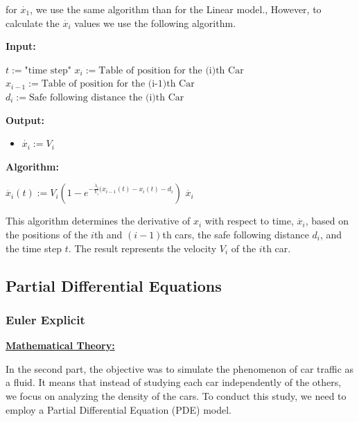 \documentclass{article}
\begin{document}
		for $\dot{x_1}$, we use the same algorithm than for the Linear model., However, to calculate the $\dot{x_i}$ values we use the following algorithm.
		
		\begin{algorithm}[H]
			\caption{$\dot{x_i}$}\label{alg:xi_dot}
			\begin{algorithmic}
				\State \textbf{Input:} \\
				\begin{itemize}
					\State $t:=\text{"time  step"}$
					\State$x_i:=\text{Table of position for the (i)th Car}$
					\State$x_{i-1}:=\text{Table of position for the (i-1)th Car}$
					\State$d_{i}:=\text{Safe following distance the (i)th Car}$
				\end{itemize}
				\State \textbf{Output:} \\
				\begin{itemize}[]
					\item $\dot{x_i}:=V_i$
				\end{itemize}
				\State \textbf{Algorithm:} \\
				\begin{itemize}[]
					\State $\dot{x_i}(t):=V_i(1-e^{-\frac{\lambda_i}{V_i}(x_{i-1}(t) - x_i(t) - d_i})$ 
					\State \Return $\dot{x_i}$ 
				\end{itemize}		
			\end{algorithmic}
		\end{algorithm}
		This algorithm determines the derivative of $x_i$ with respect to time, $\dot{x_i}$, based on the positions of the $i$th and $(i-1)$th cars, the safe following distance $d_i$, and the time step $t$. The result represents the velocity $V_i$ of the $i$th car.
		\subsection{Partial Differential Equations}
		
		\subsubsection{Euler Explicit}
		
		\textbf{\underline{Mathematical Theory:}} \newline\newline
		
		In the second part, the objective was to simulate the phenomenon of car traffic as a fluid. It means that instead of studying each car independently of the others, we focus on analyzing the density of the cars. To conduct this study, we need to employ a Partial Differential Equation (PDE) model.
		
\end{document}
